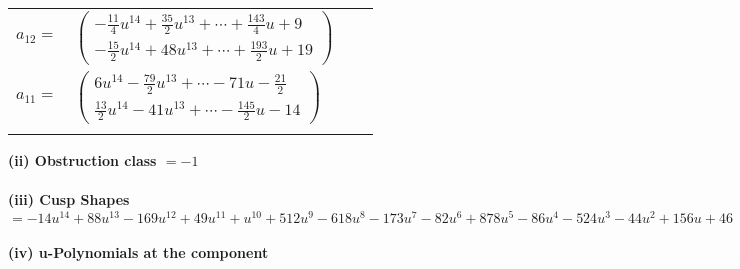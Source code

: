 \documentclass[1p]{elsarticle_modified}
\theoremstyle{definition}
\begin{document}
\begin{tabular}{m{7pt} m{180pt} m{7pt} m{180pt} }
\flushright $a_{12}=$&$\begin{pmatrix}-\frac{11}{4} u^{14}+\frac{35}{2} u^{13}+\cdots+\frac{143}{4} u+9\\-\frac{15}{2} u^{14}+48 u^{13}+\cdots+\frac{193}{2} u+19\end{pmatrix}$ \\
\flushright $a_{11}=$&$\begin{pmatrix}6 u^{14}-\frac{79}{2} u^{13}+\cdots-71 u-\frac{21}{2}\\\frac{13}{2} u^{14}-41 u^{13}+\cdots-\frac{145}{2} u-14\end{pmatrix}$\\&\end{tabular}
\flushleft \textbf{(ii) Obstruction class $= -1$}\\~\\
\flushleft \textbf{(iii) Cusp Shapes $= -14 u^{14}+88 u^{13}-169 u^{12}+49 u^{11}+u^{10}+512 u^9-618 u^8-173 u^7-82 u^6+878 u^5-86 u^4-524 u^3-44 u^2+156 u+46$}\\~\\
\newpage\renewcommand{\arraystretch}{1}
\flushleft \textbf{(iv) u-Polynomials at the component}\newline \\
\end{document}

